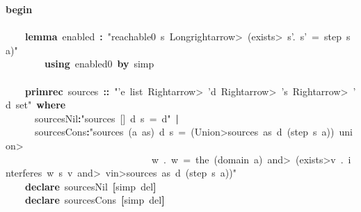 \documentclass{article}
\newcommand{\syntaxKEYWORDA}[1]{\textcolor[rgb]{0.0,0.4,0.6}{\textbf{#1}}}
\newcommand{\syntaxKEYWORDB}[1]{\textcolor[rgb]{0.0,0.6,0.4}{\textbf{#1}}}
\newcommand{\syntaxLITERALA}[1]{\textcolor[rgb]{1.0,0.0,0.8}{#1}}
\newcommand{\syntaxOPERATOR}[1]{\textcolor[rgb]{0.0,0.0,0.0}{\textbf{#1}}}
\newcommand{\syntaxKEYWORDA}[1]{\textcolor[rgb]{0.0,0.4,0.6}{\textbf{#1}}}
\newcommand{\syntaxKEYWORDB}[1]{\textcolor[rgb]{0.0,0.6,0.4}{\textbf{#1}}}
\newcommand{\syntaxLITERALA}[1]{\textcolor[rgb]{1.0,0.0,0.8}{#1}}
\newcommand{\syntaxOPERATOR}[1]{\textcolor[rgb]{0.0,0.0,0.0}{\textbf{#1}}}
\newcommand{\syntaxKEYWORDA}[1]{\textcolor[rgb]{0.0,0.4,0.6}{\textbf{#1}}}
\newcommand{\syntaxKEYWORDB}[1]{\textcolor[rgb]{0.0,0.6,0.4}{\textbf{#1}}}
\newcommand{\syntaxLITERALA}[1]{\textcolor[rgb]{1.0,0.0,0.8}{#1}}
\newcommand{\syntaxOPERATOR}[1]{\textcolor[rgb]{0.0,0.0,0.0}{\textbf{#1}}}
\newcommand{\syntaxKEYWORDA}[1]{\textcolor[rgb]{0.0,0.4,0.6}{#1}}
\newcommand{\syntaxKEYWORDB}[1]{\textcolor[rgb]{0.0,0.6,0.4}{#1}}
\newcommand{\syntaxLITERALA}[1]{\textcolor[rgb]{1.0,0.0,0.8}{\textbf{#1}}}
\newcommand{\syntaxOPERATOR}[1]{\textcolor[rgb]{0.0,0.0,0.0}{#1}}
\newcommand{\syntaxKEYWORDA}[1]{\textcolor[rgb]{0.0,0.4,0.6}{\textbf{#1}}}
\newcommand{\syntaxKEYWORDB}[1]{\textcolor[rgb]{0.0,0.6,0.4}{\textbf{#1}}}
\newcommand{\syntaxLITERALA}[1]{\textcolor[rgb]{1.0,0.0,0.8}{#1}}
\newcommand{\syntaxOPERATOR}[1]{\textcolor[rgb]{0.0,0.0,0.0}{\textbf{#1}}}
\newcommand{\syntaxKEYWORDA}[1]{\textcolor[rgb]{0.0,0.4,0.6}{\textbf{#1}}}
\newcommand{\syntaxKEYWORDB}[1]{\textcolor[rgb]{0.0,0.6,0.4}{\textbf{#1}}}
\newcommand{\syntaxLITERALA}[1]{\textcolor[rgb]{1.0,0.0,0.8}{#1}}
\newcommand{\syntaxOPERATOR}[1]{\textcolor[rgb]{0.0,0.0,0.0}{\textbf{#1}}}
\begin{document}
\syntaxKEYWORDB{begin}\hspace*{\fill}\\
\hspace*{\fill}\\
{\ }{\ }{\ }{\ }\syntaxKEYWORDA{lemma}{\ }enabled{\ }\syntaxOPERATOR{:}{\ }\syntaxLITERALA{"reachable0{\ }s{\ }\<Longrightarrow>{\ }(\<exists>{\ }s'.{\ }s'{\ }={\ }step{\ }s{\ }a)"}\hspace*{\fill}\\
{\ }{\ }{\ }{\ }{\ }{\ }{\ }{\ }\syntaxKEYWORDA{using}{\ }enabled0{\ }\syntaxKEYWORDA{by}{\ }simp\hspace*{\fill}\\
\hspace*{\fill}\\
{\ }{\ }{\ }{\ }\syntaxKEYWORDA{primrec}{\ }sources{\ }\syntaxOPERATOR{::}{\ }\syntaxLITERALA{"'e{\ }list{\ }\<Rightarrow>{\ }'d{\ }\<Rightarrow>{\ }'s{\ }\<Rightarrow>{\ }'d{\ }set"}{\ }\syntaxKEYWORDB{where}\hspace*{\fill}\\
{\ }{\ }{\ }{\ }{\ }{\ }sources\usebox{\underscorebox}Nil\syntaxOPERATOR{:}\syntaxLITERALA{"sources{\ }{[}{]}{\ }d{\ }s{\ }={\ }\usebox{\opencurlybracket}d\usebox{\closecurlybracket}"}{\ }\syntaxOPERATOR{|}\hspace*{\fill}\\
{\ }{\ }{\ }{\ }{\ }{\ }sources\usebox{\underscorebox}Cons\syntaxOPERATOR{:}\syntaxLITERALA{"sources{\ }(a{\ }\usebox{\hashbox}{\ }as){\ }d{\ }s{\ }={\ }(\<Union>\usebox{\opencurlybracket}sources{\ }as{\ }d{\ }(step{\ }s{\ }a)\usebox{\closecurlybracket}){\ }\<union>{\ }}\hspace*{\fill}\\
\syntaxLITERALA{{\ }{\ }{\ }{\ }{\ }{\ }{\ }{\ }{\ }{\ }{\ }{\ }{\ }{\ }{\ }{\ }{\ }{\ }{\ }{\ }{\ }{\ }{\ }{\ }{\ }{\ }{\ }{\ }{\ }{\ }\usebox{\opencurlybracket}w{\ }.{\ }w{\ }={\ }the{\ }(domain{\ }a){\ }\<and>{\ }(\<exists>v{\ }.{\ }interferes{\ }w{\ }s{\ }v{\ }\<and>{\ }v\<in>sources{\ }as{\ }d{\ }(step{\ }s{\ }a))\usebox{\closecurlybracket}"}\hspace*{\fill}\\
{\ }{\ }{\ }{\ }\syntaxKEYWORDA{declare}{\ }sources\usebox{\underscorebox}Nil{\ }\syntaxOPERATOR{{[}}simp{\ }del\syntaxOPERATOR{{]}}\hspace*{\fill}\\
{\ }{\ }{\ }{\ }\syntaxKEYWORDA{declare}{\ }sources\usebox{\underscorebox}Cons{\ }\syntaxOPERATOR{{[}}simp{\ }del\syntaxOPERATOR{{]}}\hspace*{\fill}\\
\end{document}
